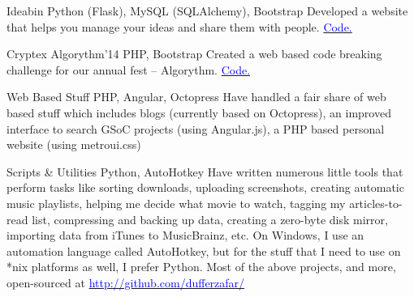    {Ideabin}
    {}
    {\scriptsize Python (Flask), MySQL (SQLAlchemy), Bootstrap}
    {}
    {
        Developed a website that helps you manage your ideas and share them with people.
        \hfill
        \href{http://github.com/ideabin/ideabin/}{\textcolor{blue}{\scriptsize Code.}}
    }
    \vspace*{0.2\baselineskip}

    {Cryptex}
    {Algorythm'14}
    {\scriptsize PHP, Bootstrap}
    {}
    {
        Created a web based code breaking challenge for our annual fest -- Algorythm.
        \hfill
        \href{http://github.com/jdevlabs/cryptex/}{\textcolor{blue}{\scriptsize Code.}}
    }
    \vspace*{0.2\baselineskip}

\cventry{}
    {Web Based Stuff}
    {}
    {\scriptsize PHP, Angular, Octopress}
    {}
    {
        Have handled a fair share of web based stuff which includes
        blogs (currently based on Octopress),
        an improved interface to search GSoC projects (using Angular.js),
        a PHP based personal website (using metroui.css)
    }
    \vspace*{0.2\baselineskip}

\cventry{}
    {Scripts \& Utilities}
    {}
    {\scriptsize Python, AutoHotkey}
    {}
    {
        Have written numerous little tools that perform tasks like
        sorting downloads,
        uploading screenshots,
        creating automatic music playlists,
        helping me decide what movie to watch,
        tagging my articles-to-read list,
        compressing and backing up data,
        creating a zero-byte disk mirror,
        importing data from iTunes to MusicBrainz, etc.
        \newline
        On Windows, I use an automation language called AutoHotkey, but for the stuff that I need to use on *nix platforms as well, I prefer Python.
        \newline
        \newline
        Most of the above projects, and more, open-sourced at \href{http://github.com/dufferzafar/}{\textcolor{blue}{http://github.com/dufferzafar/}}
    }
    \vspace*{0.2\baselineskip}
